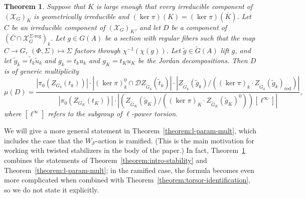 \documentclass[11pt,reqno]{amsart}
\newtheorem{theorem}{Theorem}[section]
\theoremstyle{definition}
\renewcommand{\rm}{\mathrm}
\newcommand{\sD}{{\mathscr D}}
\newcommand{\sX}{{\mathscr X}}
\newcommand{\ov}[1]{\overline{#1}}
\begin{document}
\begin{theorem}\label{theorem:intro-l-param}
    Suppose that $K$ is large enough that every irreducible component of $(\sX_G)_K$ is geometrically irreducible and $(\ker \pi)(K) = (\ker \pi)(\ov{K})$. Let $C$ be an irreducible component of $(\sX_G)_K$, and let $D$ be a component of $(\ov{C} \cap \sX_G^{\Sigma\textrm{-}\rm{reg}})_k$. Let $g \in G(A)$ be a section with regular fibers such that the map $C \to G$, $(\Phi, \Sigma) \mapsto \Sigma$ factors through $\chi^{-1}(\chi(g))$. Let $\widetilde{g} \in \widetilde{G}(A)$ lift $g$, and let $\widetilde{g}_k = \widetilde{t}_k \widetilde{u}_k$ and $g_k = t_k u_k$ and $g_K = t_K u_K$ be the Jordan decompositions. Then $D$ is of generic multiplicity
        \[
        \mu(D) = \frac{|\pi_0(Z_{G_k}(t_k))| \cdot |(\ker \pi)_k^0 \cap \sD Z_{\widetilde{G}_k}(\widetilde{t}_k)| \cdot |Z_{\widetilde{G}_k}(\widetilde{g}_k)/((\ker \pi)_k \cdot Z_{\widetilde{G}_k}(\widetilde{g}_k)_{\rm{red}})|}{|\pi_0(Z_{G_K}(t_K))| \cdot |(Z_{\widetilde{G}_K}(\widetilde{g}_K)/((\ker \pi)_K \cdot Z_{\widetilde{G}_K}(\widetilde{g}_K)^0))[\ell^\infty]|},
        \]
        where $[\ell^\infty]$ refers to the subgroup of $\ell$-power torsion.
\end{theorem}

We will give a more general statement in Theorem~\ref{theorem:l-param-mult}, which includes the case that the $W_F$-action is ramified. (This is the main motivation for working with twisted stabilizers in the body of the paper.) In fact, Theorem~\ref{theorem:intro-l-param} combines the statements of Theorem~\ref{theorem:intro-stability} and Theorem~\ref{theorem:l-param-mult}; in the ramified case, the formula becomes even more complicated when combined with Theorem~\ref{theorem:torsor-identification}, so we do not state it explicitly.
\end{document}
